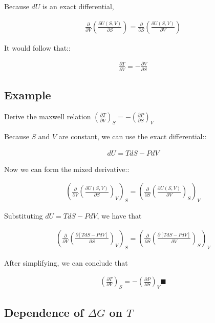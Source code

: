 \documentclass[12pt]{book}
\begin{document}
Because $dU$ is an exact differential, 

\begin{align*}
    \frac{\partial}{\partial V}\left(\frac{\partial U(S,V)}{\partial S}\right)=\frac{\partial}{\partial S}\left(\frac{\partial U(S,V)}{\partial V}\right)
\end{align*}

It would follow that::

\begin{align*}
    \frac{\partial T}{\partial V}=-\frac{\partial V}{\partial S}
\end{align*}

\subsection*{Example}

Derive the maxwell relation $\left(\frac{\partial T}{\partial V}\right)_S=-\left(\frac{\partial P}{\partial S}\right)_V$

Because $S$ and $V$ are constant, we can use the exact differential::

\begin{align*}
    dU=TdS-PdV
\end{align*}

Now we can form the mixed derivative::

\begin{align*}
    \left(\frac{\partial}{\partial V}\left(\frac{\partial U(S,V)}{\partial S}\right)_V\right)_S=\left(\frac{\partial}{\partial S}\left(\frac{\partial U(S,V)}{\partial V}\right)_S\right)_V
\end{align*}

Substituting $dU=TdS-PdV$, we have that

\begin{align*}
    \left(\frac{\partial}{\partial V}\left(\frac{\partial\left[TdS-PdV\right]}{\partial S}\right)_V\right)_S=\left(\frac{\partial}{\partial S}\left(\frac{\partial\left[TdS-PdV\right]}{\partial V}\right)_S\right)_V
\end{align*}

After simplifying, we can conclude that

\begin{align*}
    \left(\frac{\partial T}{\partial V}\right)_S=-\left(\frac{\partial P}{\partial S}\right)_V\blacksquare
\end{align*}

\subsection*{Dependence of $\Delta G$ on $T$}
\end{document}
